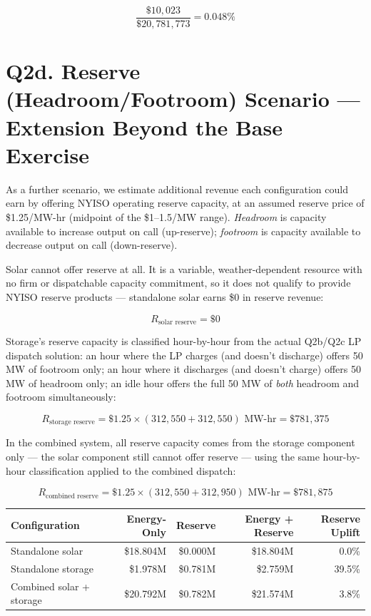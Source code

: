 \documentclass[11pt]{article}
\begin{document}
\[
\frac{\$10{,}023}{\$20{,}781{,}773}
= 0.048\%
\]

\section*{Q2d. Reserve (Headroom/Footroom) Scenario --- Extension Beyond the Base Exercise}

As a further scenario, we estimate additional revenue each configuration could earn by
offering NYISO operating reserve capacity, at an assumed reserve price of \$1.25/MW-hr
(midpoint of the \$1--1.5/MW range). \emph{Headroom} is capacity available to increase
output on call (up-reserve); \emph{footroom} is capacity available to decrease output on
call (down-reserve).

Solar cannot offer reserve at all. It is a variable, weather-dependent resource with no
firm or dispatchable capacity commitment, so it does not qualify to provide NYISO reserve
products --- standalone solar earns \$0 in reserve revenue:

\[
R_{\text{solar reserve}} = \$0
\]

Storage's reserve capacity is classified hour-by-hour from the actual Q2b/Q2c LP
dispatch solution: an hour where the LP charges (and doesn't discharge) offers 50 MW of
footroom only; an hour where it discharges (and doesn't charge) offers 50 MW of headroom
only; an idle hour offers the full 50 MW of \emph{both} headroom and footroom
simultaneously:

\[
R_{\text{storage reserve}} = \$1.25 \times (312{,}550 + 312{,}550)\text{ MW-hr} = \$781{,}375
\]

In the combined system, all reserve capacity comes from the storage component only ---
the solar component still cannot offer reserve --- using the same hour-by-hour
classification applied to the combined dispatch:

\[
R_{\text{combined reserve}} = \$1.25 \times (312{,}550 + 312{,}950)\text{ MW-hr} = \$781{,}875
\]

\begin{table}[h!]
\centering
\begin{tabular}{lrrrr}
\toprule
\textbf{Configuration} & \textbf{Energy-Only} & \textbf{Reserve} & \textbf{Energy + Reserve} & \textbf{Reserve Uplift} \\
\midrule
Standalone solar & \$18.804M & \$0.000M & \$18.804M & 0.0\% \\
Standalone storage & \$1.978M & \$0.781M & \$2.759M & 39.5\% \\
Combined solar + storage & \$20.792M & \$0.782M & \$21.574M & 3.8\% \\
\bottomrule
\end{tabular}
\end{table}
\end{document}
